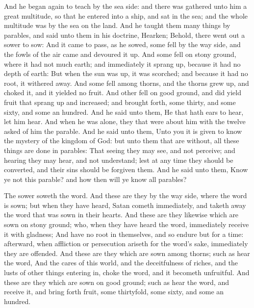  And he began again to teach by the sea side: and there was
gathered unto him a great multitude, so that he entered into a ship, and
sat in the sea; and the whole multitude was by the sea on the land.
 And he taught them many things by parables, and said unto
them in his doctrine,  Hearken; Behold, there went out a
sower to sow:  And it came to pass, as he sowed, some fell
by the way side, and the fowls of the air came and devoured it up.
 And some fell on stony ground, where it had not much earth;
and immediately it sprang up, because it had no depth of earth:
 But when the sun was up, it was scorched; and because it
had no root, it withered away.  And some fell among thorns,
and the thorns grew up, and choked it, and it yielded no fruit.
 And other fell on good ground, and did yield fruit that
sprang up and increased; and brought forth, some thirty, and some sixty,
and some an hundred.  And he said unto them, He that hath
ears to hear, let him hear.  And when he was alone, they
that were about him with the twelve asked of him the parable.
 And he said unto them, Unto you it is given to know the
mystery of the kingdom of God: but unto them that are without, all these
things are done in parables:  That seeing they may see, and
not perceive; and hearing they may hear, and not understand; lest at any
time they should be converted, and their sins should be forgiven them.
 And he said unto them, Know ye not this parable? and how
then will ye know all parables?

 The sower soweth the word.  And these are
they by the way side, where the word is sown; but when they have heard,
Satan cometh immediately, and taketh away the word that was sown in
their hearts.  And these are they likewise which are sown
on stony ground; who, when they have heard the word, immediately receive
it with gladness;  And have no root in themselves, and so
endure but for a time: afterward, when affliction or persecution ariseth
for the word's sake, immediately they are offended.  And
these are they which are sown among thorns; such as hear the word,
 And the cares of this world, and the deceitfulness of
riches, and the lusts of other things entering in, choke the word, and
it becometh unfruitful.  And these are they which are sown
on good ground; such as hear the word, and receive it, and bring forth
fruit, some thirtyfold, some sixty, and some an hundred.

